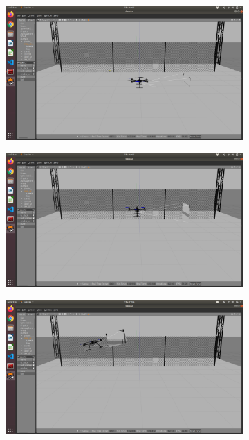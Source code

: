 \documentclass[../Head/Main.tex]{subfiles}
\begin{document}
\begin{figure}[h]
    \centering
        \begin{subfigure}{\figSize}
            \centering
            \includegraphics[width=\textwidth]{../Figures/simulation/Simulation_00.png}
        \end{subfigure}
        \begin{subfigure}{\figSize}
            \centering
            \includegraphics[width=\textwidth]{../Figures/simulation/Simulation_01.png}
        \end{subfigure}
        \begin{subfigure}{\figSize}
            \centering
            \includegraphics[width=\textwidth]{../Figures/simulation/Simulation_02.png}

\end{subfigure}
\end{figure}
\end{document}
